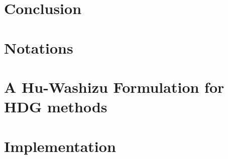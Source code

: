 \documentclass[a4paper, 11pt]{book}
\begin{document}
\chapter{Conclusion}



\appendix

\chapter{Notations}


\chapter{A Hu-Washizu Formulation for HDG methods}


\chapter{Implementation}





\end{document}

